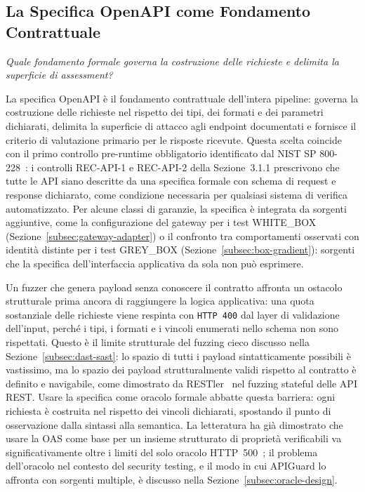 \subsection{La Specifica OpenAPI come Fondamento Contrattuale}\label{subsec:openapi-sot}

\textit{Quale fondamento formale governa la costruzione delle richieste e delimita la superficie di assessment?}

La specifica OpenAPI è il fondamento contrattuale dell'intera pipeline: governa la costruzione delle richieste nel rispetto dei tipi, dei formati e dei parametri dichiarati, delimita la superficie di attacco agli endpoint documentati e fornisce il criterio di valutazione primario per le risposte ricevute. Questa scelta coincide con il primo controllo pre-runtime obbligatorio identificato dal NIST SP 800-228~\cite{chandramouliGuidelinesAPIProtection2026}: i controlli REC-API-1 e REC-API-2 della Sezione~3.1.1 prescrivono che tutte le API siano descritte da una specifica formale con schema di request e response dichiarato, come condizione necessaria per qualsiasi sistema di verifica automatizzato.
Per alcune classi di garanzie, la specifica è integrata da sorgenti aggiuntive, come la configurazione del gateway per i test WHITE\_BOX (Sezione~\ref{subsec:gateway-adapter}) o il confronto tra comportamenti osservati con identità distinte per i test GREY\_BOX (Sezione~\ref{subsec:box-gradient}): sorgenti che la specifica dell'interfaccia applicativa da sola non può esprimere.

Un fuzzer che genera payload senza conoscere il contratto affronta un ostacolo strutturale prima ancora di raggiungere la logica applicativa: una quota sostanziale delle richieste viene respinta con \texttt{HTTP~400} dal layer di validazione dell'input, perché i tipi, i formati e i vincoli enumerati nello schema non sono rispettati.
Questo è il limite strutturale del fuzzing cieco discusso nella Sezione~\ref{subsec:dast-sast}: lo spazio di tutti i payload sintatticamente possibili è vastissimo, ma lo spazio dei payload strutturalmente validi rispetto al contratto è definito e navigabile, come dimostrato da RESTler~\cite{atlidakisRESTlerStatefulREST2019a} nel fuzzing stateful delle \gls{API} \gls{REST}. Usare la specifica come oracolo formale abbatte questa barriera: ogni richiesta è costruita nel rispetto dei vincoli dichiarati, spostando il punto di osservazione dalla sintassi alla semantica.
La letteratura ha già dimostrato che usare la \gls{OAS} come base per un insieme strutturato di proprietà verificabili va significativamente oltre i limiti del solo oracolo HTTP~500~\cite{schemathesisDerivingSemanticsawareFuzzers2022}; il problema dell'oracolo nel contesto del security testing, e il modo in cui APIGuard lo affronta con sorgenti multiple, è discusso nella Sezione~\ref{subsec:oracle-design}.

